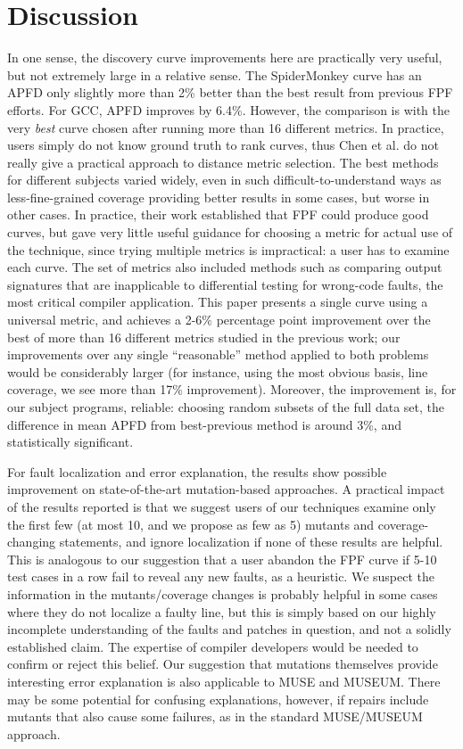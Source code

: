 

\section{Discussion}

In one sense, the discovery curve improvements here are practically very useful, but not extremely large in a relative sense.  The SpiderMonkey curve has an APFD only slightly more than 2\% better than the best result from previous FPF efforts.  For GCC, APFD improves by 6.4\%.  However, the comparison is with the very \emph{best} curve chosen after running more than 16 different metrics.  In practice, users simply do not know ground truth to rank curves, thus Chen et al. \cite{PLDI13} do not really give a practical approach to distance metric selection.  The best methods for different subjects varied widely, even in such difficult-to-understand ways as less-fine-grained coverage providing better results in some cases, but worse in other cases.   In practice, their work established that FPF could produce good curves, but gave very little useful guidance for choosing a metric for actual use of the technique, since trying multiple metrics is impractical: a user has to examine each curve.  The set of metrics also included methods such as comparing output signatures that are inapplicable to differential testing for wrong-code faults, the most critical compiler application.  This paper presents a single curve using a universal metric, and achieves a 2-6\% percentage point improvement over the best of more than 16 different metrics studied in the previous work; our improvements over any single ``reasonable'' method applied to both problems would be considerably larger (for instance, using the most obvious basis, line coverage, we see more than 17\% improvement).  Moreover, the improvement is, for our subject programs, reliable:  choosing random subsets of the full data set, the difference in mean APFD from best-previous method is around 3\%, and statistically significant.

For fault localization and error explanation, the results show possible improvement on state-of-the-art mutation-based approaches.  A practical impact of the results reported is that we suggest users of our techniques examine only the first few (at most 10, and we propose as few as 5) mutants and coverage-changing statements, and ignore localization if none of these results are helpful.  This is analogous to our suggestion that a user abandon the FPF curve if 5-10 test cases in a row fail to reveal any new faults, as a heuristic.  We suspect the information in the mutants/coverage changes is probably helpful in some cases where they do not localize a faulty line, but this is simply based on our highly incomplete understanding of the faults and patches in question, and not a solidly established claim.  The expertise of compiler developers would be needed to confirm or reject this belief.  Our suggestion that mutations themselves provide interesting error explanation is also applicable to MUSE and MUSEUM.  There may be some potential for confusing explanations, however, if repairs include mutants that also cause some failures, as in the standard MUSE/MUSEUM approach.  

